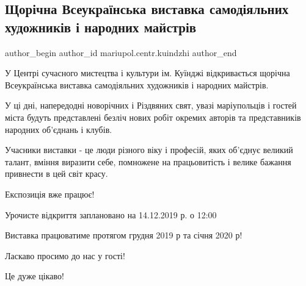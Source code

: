  
 
 
 
 

\subsection{Щорічна Всеукраїнська виставка самодіяльних художників і народних майстрів}
\label{sec:11_12_2019.fb.mariupol.centr.kuindzhi.1.vseukr_vystavka}

\ifcmt
 author_begin
   author_id mariupol.centr.kuindzhi
 author_end
\fi

У Центрі сучасного мистецтва і культури ім. Куїнджі відкривається щорічна
Всеукраїнська виставка самодіяльних художників і народних майстрів. 

У ці дні, напередодні новорічних і Різдвяних свят, увазі маріупольців і гостей
міста будуть представлені безліч нових робіт окремих авторів та представників
народних об'єднань і клубів.

Учасники виставки - це люди різного віку і професій, яких об'єднує великий
талант, вміння виразити себе, помножене на працьовитість і велике бажання
привнести в цей світ красу.

Експозиція вже працює!

Урочисте відкриття заплановано на 14.12.2019 р. о 12:00

Виставка працюватиме протягом грудня 2019 р та січня 2020 р!

Ласкаво просимо до нас у гості! 

Це дуже цікаво!
